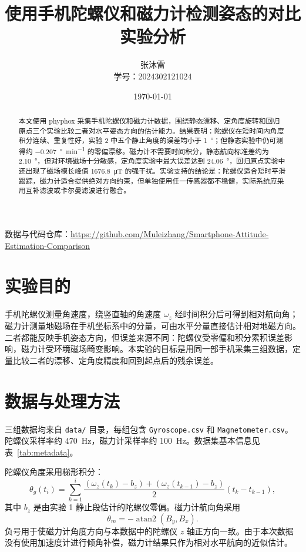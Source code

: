 \documentclass[UTF8,a4paper,12pt]{ctexart}
\title{使用手机陀螺仪和磁力计检测姿态的对比实验分析}
\author{张沐雷\\学号：2024302121024}
\date{\today}
\begin{document}
\maketitle

\begin{center}
\small
数据与代码仓库：\url{https://github.com/Muleizhang/Smartphone-Attitude-Estimation-Comparison}
\end{center}

\begin{abstract}
本文使用 phyphox 采集手机陀螺仪和磁力计数据，围绕静态漂移、定角度旋转和回归原点三个实验比较二者对水平姿态方向的估计能力。结果表明：陀螺仪在短时间内角度积分连续、重复性好，实验 2 中五个静止角度的误差均小于 \SI{1}{\degree}；但静态实验中仍可测得约 \SI{-0.207}{\degree\per\minute} 的零偏漂移。磁力计不需要时间积分，静态航向标准差约为 \SI{2.10}{\degree}，但对环境磁场十分敏感，定角度实验中最大误差达到 \SI{24.06}{\degree}，回归原点实验中还出现了磁场模长峰值 \SI{1676.8}{\micro\tesla} 的强干扰。实验支持的结论是：陀螺仪适合短时平滑跟踪，磁力计适合提供绝对方向约束，但单独使用任一传感器都不稳健，实际系统应采用互补滤波或卡尔曼滤波进行融合。
\end{abstract}

\section{实验目的}

手机陀螺仪测量角速度，绕竖直轴的角速度 $\omega_z$ 经时间积分后可得到相对航向角；磁力计测量地磁场在手机坐标系中的分量，可由水平分量直接估计相对地磁方向。二者都能反映手机姿态方向，但误差来源不同：陀螺仪受零偏和积分累积误差影响，磁力计受环境磁场畸变影响。本实验的目标是用同一部手机采集三组数据，定量比较二者的漂移、定角度精度和回到起点后的残余误差。

\section{数据与处理方法}

三组数据均来自 \texttt{data/} 目录，每组包含 \texttt{Gyroscope.csv} 和 \texttt{Magnetometer.csv}。陀螺仪采样率约 \SI{470}{\hertz}，磁力计采样率约 \SI{100}{\hertz}。数据集基本信息见表~\ref{tab:metadata}。



陀螺仪角度采用梯形积分：
\begin{equation}
  \theta_g(t_i)=\sum_{k=1}^{i}\frac{(\omega_z(t_k)-b_z)+(\omega_z(t_{k-1})-b_z)}{2}
  (t_k-t_{k-1}),
\end{equation}
其中 $b_z$ 是由实验 1 静止段估计的陀螺仪零偏。磁力计航向角采用
\begin{equation}
  \theta_m=-\operatorname{atan2}(B_y,B_x).
\end{equation}
负号用于使磁力计角度方向与本数据中的陀螺仪 $z$ 轴正方向一致。由于本次数据没有使用加速度计进行倾角补偿，磁力计结果只作为相对水平航向的近似估计。
\end{document}
